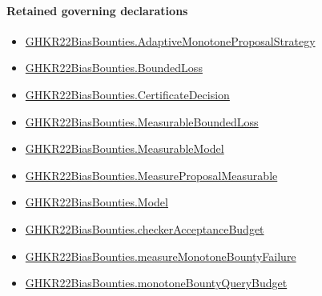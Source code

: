 \documentclass[10pt]{article}
\begin{document}
\paragraph{Retained governing declarations}
\begin{itemize}\raggedright
\item \hyperlink{governing-declaration-975ce4ec5f91862b}{GHKR22\allowbreak{}Bias\allowbreak{}Bounties.\allowbreak{}Adaptive\allowbreak{}Monotone\allowbreak{}Proposal\allowbreak{}Strategy}
\item \hyperlink{paper-prerequisite-ef6c319b0770dad4}{GHKR22\allowbreak{}Bias\allowbreak{}Bounties.\allowbreak{}Bounded\allowbreak{}Loss}
\item \hyperlink{governing-declaration-7881732e3fc3c15e}{GHKR22\allowbreak{}Bias\allowbreak{}Bounties.\allowbreak{}Certificate\allowbreak{}Decision}
\item \hyperlink{governing-declaration-56b96e1cde76e3f7}{GHKR22\allowbreak{}Bias\allowbreak{}Bounties.\allowbreak{}Measurable\allowbreak{}Bounded\allowbreak{}Loss}
\item \hyperlink{governing-declaration-8b721c00962c326a}{GHKR22\allowbreak{}Bias\allowbreak{}Bounties.\allowbreak{}Measurable\allowbreak{}Model}
\item \hyperlink{governing-declaration-034d3030fa5618e0}{GHKR22\allowbreak{}Bias\allowbreak{}Bounties.\allowbreak{}Measure\allowbreak{}Proposal\allowbreak{}Measurable}
\item \hyperlink{paper-prerequisite-333127605c12eba8}{GHKR22\allowbreak{}Bias\allowbreak{}Bounties.\allowbreak{}Model}
\item \hyperlink{paper-prerequisite-3296eacfe5745d61}{GHKR22\allowbreak{}Bias\allowbreak{}Bounties.\allowbreak{}checker\allowbreak{}Acceptance\allowbreak{}Budget}
\item \hyperlink{governing-declaration-c57b00de25674c10}{GHKR22\allowbreak{}Bias\allowbreak{}Bounties.\allowbreak{}measure\allowbreak{}Monotone\allowbreak{}Bounty\allowbreak{}Failure}
\item \hyperlink{governing-declaration-8e4ae409a7332d6c}{GHKR22\allowbreak{}Bias\allowbreak{}Bounties.\allowbreak{}monotone\allowbreak{}Bounty\allowbreak{}Query\allowbreak{}Budget}
\end{itemize}
\end{document}
